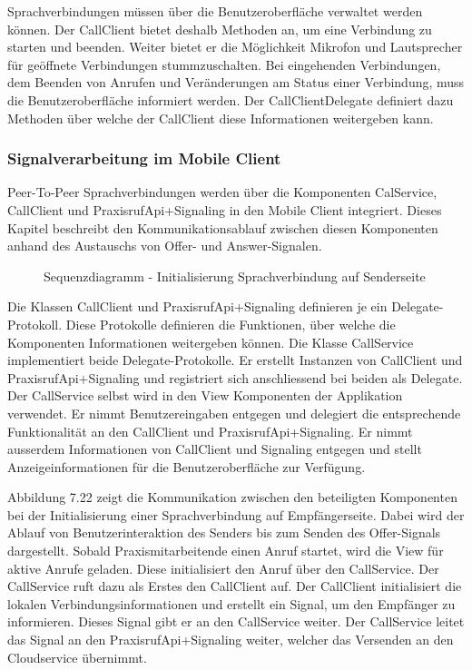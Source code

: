 Sprachverbindungen müssen über die Benutzeroberfläche verwaltet werden können.
Der CallClient bietet deshalb Methoden an, um eine Verbindung zu starten und beenden.
Weiter bietet er die Möglichkeit Mikrofon und Lautsprecher für geöffnete Verbindungen stummzuschalten.
Bei eingehenden Verbindungen, dem Beenden von Anrufen und Veränderungen am Status einer Verbindung, muss die Benutzeroberfläche informiert werden.
Der CallClientDelegate definiert dazu Methoden über welche der CallClient diese Informationen weitergeben kann.

\subsubsection{Signalverarbeitung im Mobile Client}

Peer-To-Peer Sprachverbindungen werden über die Komponenten CalService, CallClient und PraxisrufApi+Signaling in den Mobile Client integriert.
Dieses Kapitel beschreibt den Kommunikationsablauf zwischen diesen Komponenten anhand des Austauschs von Offer- und Answer-Signalen.

\begin{figure}[h]
    \centering
    \begin{minipage}[b]{0.85\textwidth}
        \caption{Sequenzdiagramm - Initialisierung Sprachverbindung auf Senderseite }
    \end{minipage}
\end{figure}


Die Klassen CallClient und PraxisrufApi+Signaling definieren je ein Delegate-Protokoll.
Diese Protokolle definieren die Funktionen, über welche die Komponenten Informationen weitergeben können.
Die Klasse CallService implementiert beide Delegate-Protokolle.
Er erstellt Instanzen von CallClient und PraxisrufApi+Signaling und registriert sich anschliessend bei beiden als Delegate.
Der CallService selbst wird in den View Komponenten der Applikation verwendet.
Er nimmt Benutzereingaben entgegen und delegiert die entsprechende Funktionalität an den CallClient und PraxisrufApi+Signaling.
Er nimmt ausserdem Informationen von CallClient und Signaling entgegen und stellt Anzeigeinformationen für die Benutzeroberfläche zur Verfügung.

Abbildung 7.22 zeigt die Kommunikation zwischen den beteiligten Komponenten bei der Initialisierung einer Sprachverbindung auf Empfängerseite.
Dabei wird der Ablauf von Benutzerinteraktion des Senders bis zum Senden des Offer-Signals dargestellt.
Sobald Praxismitarbeitende einen Anruf startet, wird die View für aktive Anrufe geladen.
Diese initialisiert den Anruf über den CallService.
Der CallService ruft dazu als Erstes den CallClient auf.
Der CallClient initialisiert die lokalen Verbindungsinformationen und erstellt ein Signal, um den Empfänger zu informieren.
Dieses Signal gibt er an den CallService weiter.
Der CallService leitet das Signal an den PraxisrufApi+Signaling weiter, welcher das Versenden an den Cloudservice übernimmt.

